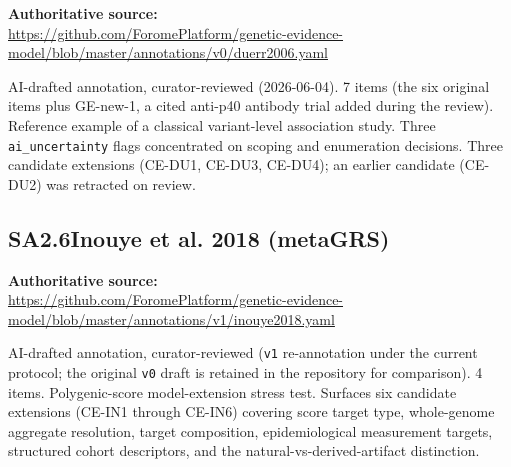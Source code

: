 \noindent\textbf{Authoritative source:}\\
\url{https://github.com/ForomePlatform/genetic-evidence-model/blob/master/annotations/v0/duerr2006.yaml}

\medskip
\noindent AI-drafted annotation, curator-reviewed (2026-06-04). 7
\GeneticEvidence{} items (the six original items plus GE-new-1, a cited
anti-p40 antibody trial added during the review). Reference example of
a classical variant-level association study. Three
\texttt{ai\_uncertainty} flags concentrated on scoping and enumeration
decisions. Three candidate extensions (CE-DU1, CE-DU3, CE-DU4); an
earlier candidate (CE-DU2) was retracted on review.



\subsection*{SA2.6\quad Inouye et al. 2018 (metaGRS)}

\noindent\textbf{Authoritative source:}\\
\url{https://github.com/ForomePlatform/genetic-evidence-model/blob/master/annotations/v1/inouye2018.yaml}

\medskip
\noindent AI-drafted annotation, curator-reviewed (\texttt{v1}
re-annotation under the current protocol; the original \texttt{v0} draft
is retained in the repository for comparison). 4 \GeneticEvidence{}
items. Polygenic-score model-extension stress test. Surfaces six
candidate extensions (CE-IN1 through CE-IN6) covering score target
type, whole-genome aggregate resolution, target composition,
epidemiological measurement targets, structured cohort descriptors, and
the natural-vs-derived-artifact distinction.


